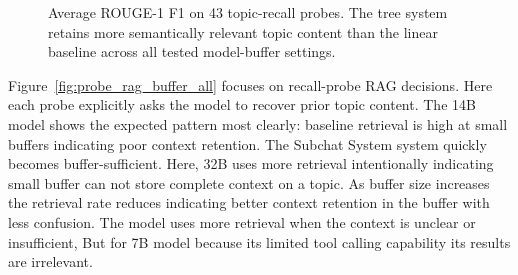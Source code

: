 \begin{figure}[htbp]
\centering
{}
\caption{Average ROUGE-1 F1 on 43 topic-recall probes. The tree system retains more semantically relevant topic content than the linear baseline across all tested model-buffer settings.}
\label{fig:rouge1_buffer_all}
\end{figure}

Figure~\ref{fig:probe_rag_buffer_all} focuses on recall-probe RAG decisions. Here each probe explicitly asks the model to recover prior topic content. The 14B model shows the expected pattern most clearly: baseline retrieval is high at small buffers indicating poor context retention. The Subchat System system quickly becomes buffer-sufficient. Here, 32B uses more retrieval intentionally indicating small buffer can not store complete context on a topic. As buffer size increases the retrieval rate reduces indicating better context retention in the buffer with less confusion. The model uses more retrieval when the context is unclear or insufficient, But for 7B model because its limited tool calling capability its results are irrelevant.



